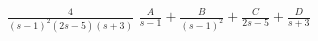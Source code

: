 {$\displaystyle \frac{4}{(s-1)^2(2s-5)(s+3)}$}
{$\displaystyle \frac{A}{s-1} + \frac{B}{(s-1)^2} + \frac{C}{2s-5} + \frac{D}{s+3}$}
